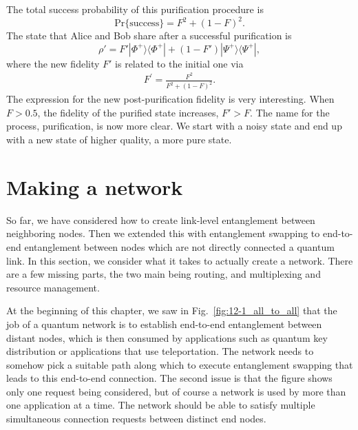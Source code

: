 The total success probability of this purification procedure is
\begin{equation}
    \text{Pr} \{\text{success}\} = F^2 + (1 - F)^2.
\end{equation}
The state that Alice and Bob share after a successful purification is
\begin{equation}
    \rho' = F' |\Phi^+\rangle\langle\Phi^+| + (1 - F') |\Psi^+\rangle\langle\Psi^+|,
\end{equation}
where the new fidelity $F'$ is related to the initial one via
\begin{align}
    F^{\prime}=\frac{F^{2}}{F^{2}+(1-F)^{2}}.
\end{align}
The expression for the new post-purification fidelity is very interesting.
When $F > 0.5$, the fidelity of the purified state increases, $F' > F$.
The name for the process, purification, is now more clear.
We start with a noisy state and end up with a new state of higher quality, a more pure state.




\section{Making a network}


So far, we have considered how to create link-level entanglement between neighboring nodes.
Then we extended this with entanglement swapping to end-to-end entanglement between nodes which are not directly connected a quantum link.
In this section, we consider what it takes to actually create a network.
There are a few missing parts, the two main being routing, and multiplexing and resource management.

At the beginning of this chapter, we saw in Fig.~\ref{fig:12-1_all_to_all} that the job of a quantum network is to establish end-to-end entanglement between distant nodes, which is then consumed by applications such as quantum key distribution or applications that use teleportation.
The network needs to somehow pick a suitable path along which to execute entanglement swapping that leads to this end-to-end connection.
The second issue is that the figure shows only one request being considered, but of course a network is used by more than one application at a time.
The network should be able to satisfy multiple simultaneous connection requests between distinct end nodes.

